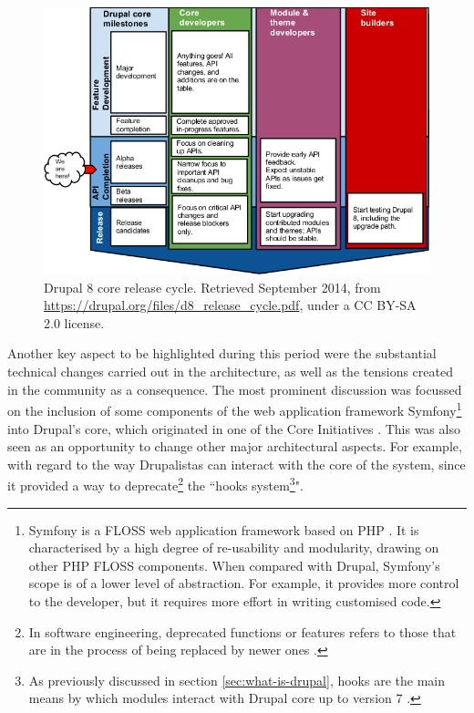 \begin{figure}[H]
	\centering
	\includegraphics[scale=0.8]{img/d8_release_cycle.png}
	\caption[Drupal 8 core release cycle]%
	{Drupal 8 core release cycle. Retrieved  September 2014, from \url{https://drupal.org/files/d8_release_cycle.pdf}, under a CC BY-SA 2.0 license.}
	\label{drupal-8-core-release}
\end{figure}

Another key aspect to be highlighted during this period were the substantial technical changes carried out in the architecture, as well as the tensions created in the community as a consequence. The most prominent discussion was focussed on the inclusion of some components of the web application framework Symfony\footnote{Symfony is a FLOSS web application framework based on PHP \parencite{symfony:2017:Online}. It is characterised by a high degree of re-usability and modularity, drawing on other PHP FLOSS components. When compared with Drupal, Symfony's scope is of a lower level of abstraction. For example, it provides more control to the developer, but it requires more effort in writing customised code.} into Drupal's core, which originated in one of the Core Initiatives \parencite{drupal-8-symfony-webservices:2017:Online, drupal-8-symfony-webservices2:2017:Online}. This was also seen as an opportunity to change other major architectural aspects. For example, with regard to the way Drupalistas can interact with the core of the system, since it provided a way to deprecate\footnote{\label{deprecate}In software engineering, deprecated functions or features refers to those that are in the process of being replaced by newer ones \parencite{deprecate:2017:Online}.} the ``hooks system\footnote{As previously discussed in section \ref{sec:what-is-drupal}, hooks are the main means by which modules interact with Drupal core up to version 7 \parencite{drupal-hooks:2016:Online}.}".


